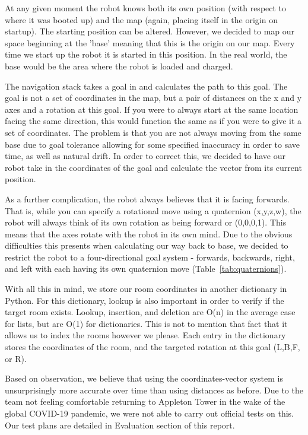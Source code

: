 \documentclass{article}
\begin{document}
At any given moment the robot knows both its own position (with respect to where it was booted up) and the map (again, placing itself in the origin on startup). The starting position can be altered. However, we decided to map our space beginning at the 'base' meaning that this is the origin on our map. Every time we start up the robot it is started in this position. In the real world, the base would be the area where the robot is loaded and charged.

The navigation stack takes a goal in and calculates the path to this goal. The goal is not a set of coordinates in the map, but a pair of distances on the x and y axes and a rotation at this goal. If you were to always start at the same location facing the same direction, this would function the same as if you were to give it a set of coordinates. The problem is that you are not always moving from the same base due to goal tolerance allowing for some specified inaccuracy in order to save time, as well as natural drift. In order to correct this, we decided to have our robot take in the coordinates of the goal and calculate the vector from its current position.

As a further complication, the robot always believes that it is facing forwards. That is, while you can specify a rotational move using a quaternion (x,y,z,w), the robot will always think of its own rotation as being forward or (0,0,0,1). This means that the axes rotate with the robot in its own mind. Due to the obvious difficulties this presents when calculating our way back to base, we decided to restrict the robot to a four-directional goal system - forwards, backwards, right, and left with each having its own quaternion move (Table~\ref{tab:quaternions}).

With all this in mind, we store our room coordinates in another dictionary in Python. For this dictionary, lookup is also important in order to verify if the target room exists. Lookup, insertion, and deletion are O(n) in the average case for lists, but are O(1) for dictionaries. This is not to mention that fact that it allows us to index the rooms however we please. Each entry in the dictionary stores the coordinates of the room, and the targeted rotation at this goal (L,B,F, or R).

Based on observation, we believe that using the coordinates-vector system is unsurprisingly more accurate over time than using distances as before. Due to the team not feeling comfortable returning to Appleton Tower in the wake of the global COVID-19 pandemic, we were not able to carry out official tests on this. Our test plans are detailed in Evaluation section of this report.
\end{document}
